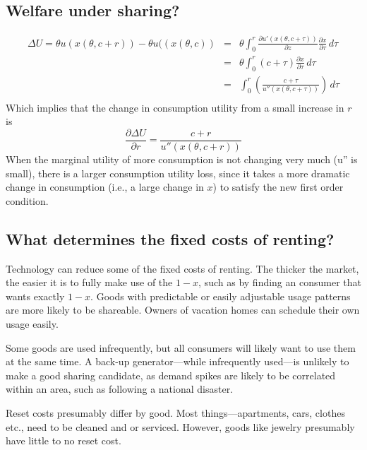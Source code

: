 \documentclass[11pt]{article}
\begin{document}
\subsection{Welfare under sharing?} 

\begin{eqnarray*}
\Delta U = \theta u(x(\theta, c+r)) - \theta u((x(\theta, c))  &=& \theta \int_0^r \frac{\partial u'(x(\theta, c + \tau))}{\partial z} \frac{\partial x}{\partial \tau} \, d\tau  \\ 
                                      &=& \theta \int_0^r \left(c + \tau\right) \frac{\partial x}{\partial \tau} \, d\tau \\   
                                      &=& \int_0^r \left(\frac{c + \tau}{u''(x(\theta, c + \tau))}\right)\,d\tau \\   
\end{eqnarray*} 
Which implies that the change in consumption utility from a small increase in $r$ is 
\begin{equation}
\frac{\partial \Delta U}{\partial r} = \frac{c + r}{u''(x(\theta, c + r))} 
\end{equation} 
When the marginal utility of more consumption is not changing very much (u'' is small), 
there is a larger consumption utility loss, since it takes a more dramatic change in consumption (i.e., a large change in $x$) to satisfy the new first order condition.  



\subsection{What determines the fixed costs of renting?} 
Technology can reduce some of the fixed costs of renting. 
The thicker the market, the easier it is to fully make use of the $1-x$, such as by finding an consumer that wants exactly $1-x$.  
Goods with predictable or easily adjustable usage patterns are more likely to be shareable. 
Owners of vacation homes can schedule their own usage easily. 

Some goods are used infrequently, but all consumers will likely want to use them at the same time. 
A back-up generator---while infrequently used---is unlikely to make a good sharing candidate, as demand spikes are likely to be correlated within an area, such as following a national disaster. 

Reset costs presumably differ by good. 
Most things---apartments, cars, clothes etc., need to be cleaned and or serviced. 
However, goods like jewelry presumably have little to no reset cost.
\end{document}
